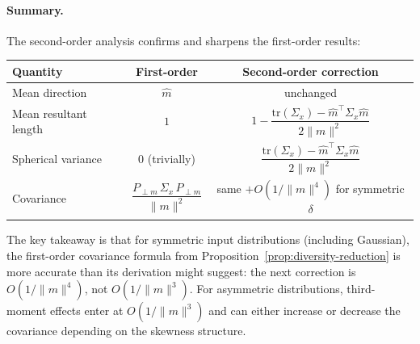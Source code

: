 \paragraph{Summary.}
The second-order analysis confirms and sharpens the first-order results:
%
\begin{center}
\begin{tabular}{lcc}
  \toprule
  \textbf{Quantity} & \textbf{First-order} & \textbf{Second-order correction} \\
  \midrule
  Mean direction & $\hat{m}$ & unchanged \\[4pt]
  Mean resultant length & $1$ &
    $1 - \dfrac{\mathrm{tr}(\Sigma_x) - \hat{m}^\top\Sigma_x\hat{m}}{2\|m\|^2}$ \\[10pt]
  Spherical variance & $0$ (trivially) &
    $\dfrac{\mathrm{tr}(\Sigma_x) - \hat{m}^\top\Sigma_x\hat{m}}{2\|m\|^2}$ \\[10pt]
  Covariance &
    $\dfrac{P_{\perp m}\,\Sigma_x\,P_{\perp m}}{\|m\|^2}$ &
    same $+ O(1/\|m\|^4)$ for symmetric $\delta$ \\[6pt]
  \bottomrule
\end{tabular}
\end{center}
%
\noindent
The key takeaway is that for symmetric input distributions (including
Gaussian), the first-order covariance formula from
Proposition~\ref{prop:diversity-reduction} is more accurate than its
derivation might suggest: the next correction is $O(1/\|m\|^4)$, not
$O(1/\|m\|^3)$.
For asymmetric distributions, third-moment effects enter at
$O(1/\|m\|^3)$ and can either increase or decrease the covariance
depending on the skewness structure.
